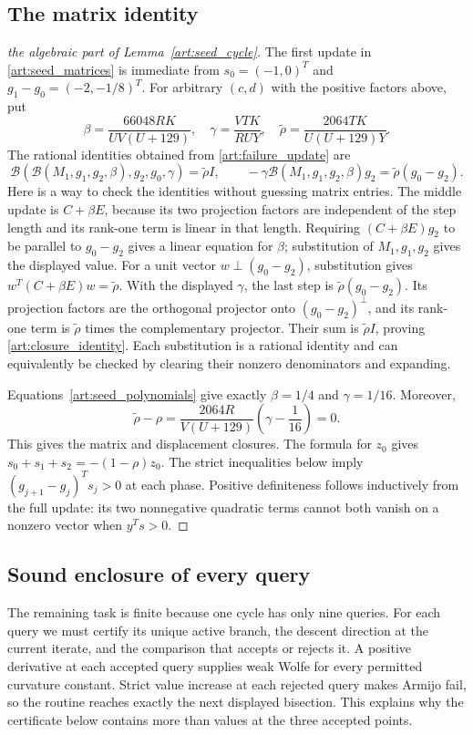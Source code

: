 \subsection{The matrix identity}
\begin{proof}[the algebraic part of Lemma~\ref{art:seed_cycle}]
The first update in \eqref{art:seed_matrices} is immediate from
$s_0=(-1,0)^T$ and $g_1-g_0=(-2,-1/8)^T$.
For arbitrary $(c,d)$ with the positive factors above, put
\[
 \beta=\frac{66048RK}{UV(U+129)},\quad
 \gamma=\frac{VTK}{RUY},\quad
 \widetilde\rho=\frac{2064TK}{U(U+129)Y}.
\]
The rational identities obtained from \eqref{art:failure_update} are
\begin{equation}\label{art:closure_identity}
 \mathcal B(\mathcal B(M_1,g_1,g_2,\beta),g_2,g_0,\gamma)
     =\widetilde\rho I,\qquad
 -\gamma\mathcal B(M_1,g_1,g_2,\beta)g_2
     =\widetilde\rho(g_0-g_2).
\end{equation}
Here is a way to check the identities without guessing matrix entries.
The middle update is $C+\beta E$, because its two projection factors
are independent of the step length and its rank-one term is linear in
that length. Requiring $(C+\beta E)g_2$ to be parallel to $g_0-g_2$
gives a linear equation for $\beta$; substitution of $M_1,g_1,g_2$
gives the displayed value. For a unit vector $w\perp(g_0-g_2)$,
substitution gives $w^T(C+\beta E)w=\widetilde\rho$.
With the displayed $\gamma$, the last step is
$\widetilde\rho(g_0-g_2)$. Its projection factors are the orthogonal
projector onto $(g_0-g_2)^\perp$, and its rank-one term is
$\widetilde\rho$ times the complementary projector. Their sum is
$\widetilde\rho I$, proving \eqref{art:closure_identity}.
Each substitution is a rational identity and can equivalently be
checked by clearing their nonzero denominators and expanding.

Equations~\eqref{art:seed_polynomials} give exactly
$\beta=1/4$ and $\gamma=1/16$. Moreover,
\[
 \widetilde\rho-\rho=
 \frac{2064R}{V(U+129)}\left(\gamma-\frac1{16}\right)=0.
\]
This gives the matrix and displacement closures. The formula for $z_0$
gives $s_0+s_1+s_2=-(1-\rho)z_0$.
The strict inequalities below imply
$(g_{j+1}-g_j)^Ts_j>0$ at each phase. Positive definiteness follows
inductively from the full update: its two nonnegative quadratic terms
cannot both vanish on a nonzero vector when $y^Ts>0$.
\end{proof}

\subsection{Sound enclosure of every query}
The remaining task is finite because one cycle has only nine queries.
For each query we must certify its unique active branch, the descent
direction at the current iterate, and the comparison that accepts or
rejects it. A positive derivative at each accepted query supplies weak
Wolfe for every permitted curvature constant. Strict value increase at
each rejected query makes Armijo fail, so the routine reaches exactly
the next displayed bisection. This explains why the certificate below
contains more than values at the three accepted points.

